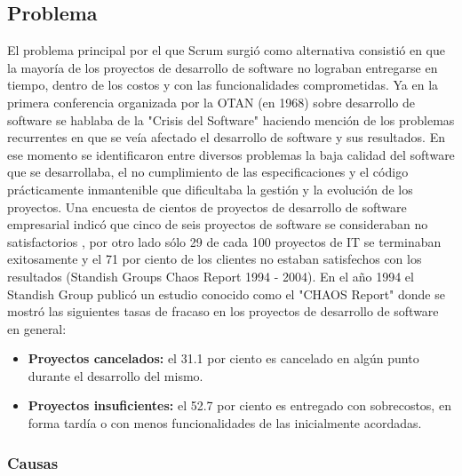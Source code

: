 \subsection{Problema}

El problema principal por el que Scrum surgió como alternativa consistió en que la mayoría de los proyectos de desarrollo de software no lograban entregarse en tiempo, dentro de los costos y con las funcionalidades comprometidas. Ya en la primera conferencia organizada por la OTAN (en 1968) sobre desarrollo de software se hablaba de la "Crisis del Software" haciendo mención de los problemas recurrentes en que se veía afectado el desarrollo de software y sus resultados. En ese momento se identificaron entre diversos problemas la baja calidad del software que se desarrollaba, el no cumplimiento de las especificaciones y el código prácticamente inmantenible que dificultaba la gestión y la evolución de los proyectos. Una encuesta de cientos de proyectos de desarrollo de software empresarial indicó que cinco de seis proyectos de software se consideraban no satisfactorios \cite{AntiPatterns-1998}, por otro lado sólo 29 de cada 100 proyectos de IT se terminaban exitosamente y el 71 por ciento de los clientes no estaban satisfechos con los resultados (Standish Groups Chaos Report 1994 - 2004). En el año 1994 el Standish Group publicó un estudio conocido como el "CHAOS Report" \cite{CHAOS-Report-1994} donde se mostró las siguientes tasas de fracaso en los proyectos de desarrollo de software en general:

\begin{itemize}

\item \textbf{Proyectos cancelados:} el 31.1 por ciento es cancelado en algún punto durante el desarrollo del mismo.
\item \textbf{Proyectos insuficientes:} el 52.7 por ciento es entregado con sobrecostos, en forma tardía o con menos funcionalidades de las inicialmente acordadas.


\end{itemize}

\subsubsection{Causas}

